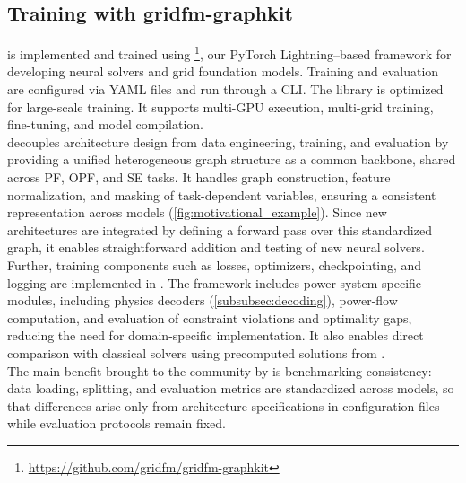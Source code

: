 \subsection{Training \genco with gridfm-graphkit}


\label{subsec:graphkit}

\genco is implemented and trained using \graphkit\footnote{\url{https://github.com/gridfm/gridfm-graphkit}},
our PyTorch Lightning–based framework for developing neural solvers and grid foundation models. Training and evaluation are configured via YAML files and run through a CLI. The library is optimized for large-scale training. It supports multi-GPU execution, multi-grid training, fine-tuning, and model compilation.\\

\graphkit decouples architecture design from data engineering, training, and evaluation by providing a unified heterogeneous graph structure as a common backbone, shared across PF, OPF, and SE tasks. It handles graph construction, feature normalization, and masking of task-dependent variables, ensuring a consistent representation across models (\cref{fig:motivational_example}). Since new architectures are integrated by defining a forward pass over this standardized graph, it enables straightforward addition and testing of new neural solvers. Further, training components such as losses, optimizers, checkpointing, and logging are implemented in \graphkit. The framework includes power system-specific modules, including physics decoders (\cref{subsubsec:decoding}), power-flow computation, and evaluation of constraint violations and optimality gaps, reducing the need for domain-specific implementation. It also enables direct comparison with classical solvers using precomputed solutions from \datakit.\\

The main benefit brought to the community by \graphkit is benchmarking consistency: data loading, splitting, and evaluation metrics are standardized across models, so that differences arise only from architecture specifications in configuration files while evaluation protocols remain fixed.\\


